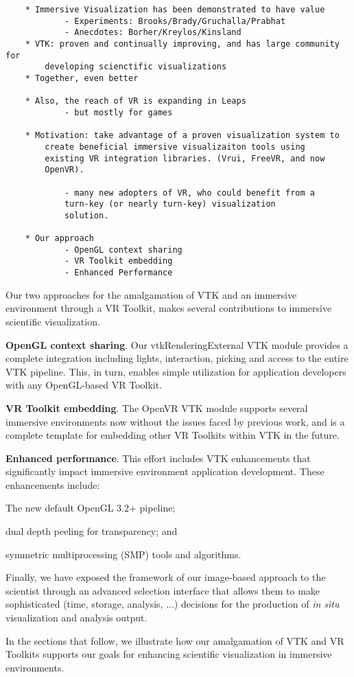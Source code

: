 
\begin{verbatim}
	* Immersive Visualization has been demonstrated to have value
		    - Experiments: Brooks/Brady/Gruchalla/Prabhat
		    - Anecdotes: Borher/Kreylos/Kinsland
	* VTK: proven and continually improving, and has large community for
		developing scienctific visualizations
	* Together, even better

	* Also, the reach of VR is expanding in Leaps
		    - but mostly for games

	* Motivation: take advantage of a proven visualization system to
		create beneficial immersive visualizaiton tools using
		existing VR integration libraries. (Vrui, FreeVR, and now
		OpenVR).

		    - many new adopters of VR, who could benefit from a
			turn-key (or nearly turn-key) visualization
			solution.

	* Our approach
		    - OpenGL context sharing
		    - VR Toolkit embedding
		    - Enhanced Performance

\end{verbatim}


Our two approaches for the amalgamation of VTK and an immersive environment through a VR Toolkit, makes several contributions to immersive scientific visualization.

\textbf{OpenGL context sharing}. Our vtkRenderingExternal VTK module provides a complete integration including lights, interaction, picking and access to the entire VTK pipeline. This, in turn, enables simple utilization for application developers with any OpenGL-based VR Toolkit.

\textbf{VR Toolkit embedding}. The OpenVR VTK module supports several immersive environments now without the issues faced by previous work, and is a complete template for embedding other VR Toolkits within VTK in the future.

\textbf{Enhanced performance}. This effort includes VTK enhancements that significantly impact immersive environment application development. These enhancements include:

\begin{compactitem}
\item The new default OpenGL 3.2+ pipeline;
\item dual depth peeling for transparency; and 
\item symmetric multiprocessing (SMP) tools and algorithms.
\end{compactitem}

Finally, we have exposed the framework of our image-based approach to the scientist through an advanced selection interface that allows them to make sophisticated (time, storage, analysis, ...) decisions for the production of \textit{in situ} visualization and analysis output.

In the sections that follow, we illustrate how our amalgamation of VTK and VR Toolkits supports our goals for enhancing scientific visualization in immersive environments.
